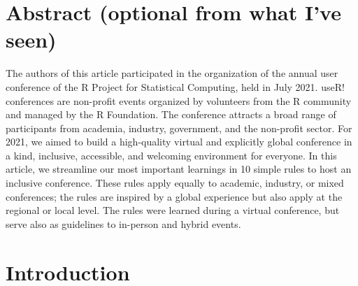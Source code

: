 \documentclass[10pt,letterpaper]{article}
\begin{document}
\section*{Abstract (optional from what I've seen)}

The authors of this article participated in the organization of the annual user conference of the R Project for Statistical Computing, held in July 2021. useR! conferences are non-profit events organized by volunteers from the R community and managed by the R Foundation. The conference attracts a broad range of participants from academia, industry, government, and the non-profit sector. For 2021, we aimed to build a high-quality virtual and explicitly global conference in a kind, inclusive, accessible, and welcoming environment for everyone. 
In this article, we streamline our most important learnings in 10 simple rules to host an inclusive conference. These rules apply equally to academic, industry, or mixed conferences; the rules are inspired by a global experience but also apply at the regional or local level. The rules were learned during a virtual conference, but serve also as guidelines to in-person and hybrid events.   





\linenumbers

\section*{Introduction}
\end{document}
